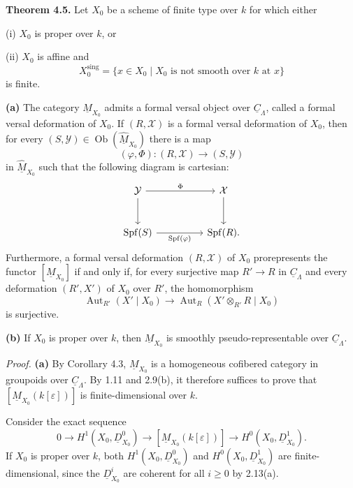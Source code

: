 
\medskip
\noindent\textbf{Theorem 4.5.}
Let $X_0$ be a scheme of finite type over $k$ for which either

\smallskip
\noindent(i) $X_0$ is proper over $k$, or

\noindent(ii) $X_0$ is affine and
\[
X_0^{\mathrm{sing}}
=\{x\in X_0\mid X_0\text{ is not smooth over }k\text{ at }x\}
\]
is finite.

\smallskip
\noindent\textbf{(a)}
The category $\underline M_{X_0}$ admits a formal versal object over
$\underline C_\Lambda$, called a formal versal deformation of $X_0$.
If $(R,\mathcal X)$ is a formal versal deformation of $X_0$, then for
every $(S,\mathcal Y)\in\operatorname{Ob}(\widehat{\underline M}_{X_0})$
there is a map
\[
(\varphi,\Phi):(R,\mathcal X)\longrightarrow(S,\mathcal Y)
\]
in $\widehat{\underline M}_{X_0}$ such that the following diagram is
cartesian:
\[
\begin{tikzcd}[column sep=huge,row sep=large]
\mathcal Y \arrow[r,"\Phi"] \arrow[d]
& \mathcal X \arrow[d] \\
\operatorname{Spf}(S)
 \arrow[r,"\operatorname{Spf}(\varphi)"']
& \operatorname{Spf}(R).
\end{tikzcd}
\]
Furthermore, a formal versal deformation $(R,\mathcal X)$ of $X_0$
prorepresents the functor $[\underline M_{X_0}]$ if and only if, for
every surjective map $R'\longrightarrow R$ in $\underline C_\Lambda$
and every deformation $(R',X')$ of $X_0$ over $R'$, the homomorphism
\[
\operatorname{Aut}_{R'}(X'\mid X_0)
\longrightarrow
\operatorname{Aut}_R(X'\otimes_{R'}R\mid X_0)
\]
is surjective.

\smallskip
\noindent\textbf{(b)}
If $X_0$ is proper over $k$, then $\underline M_{X_0}$ is smoothly
pseudo-representable over $\underline C_\Lambda$.


\medskip
\noindent\textit{Proof.}
\textbf{(a)} By Corollary 4.3, $\underline M_{X_0}$ is a homogeneous
cofibered category in groupoids over $\underline C_\Lambda$. By 1.11
and 2.9(b), it therefore suffices to prove that
$[\underline M_{X_0}(k[\varepsilon])]$ is finite-dimensional over
$k$.

Consider the exact sequence
\begin{equation}\tag{*}
0\longrightarrow H^1(X_0,\underline D^0_{X_0})
\longrightarrow[\underline M_{X_0}(k[\varepsilon])]
\longrightarrow H^0(X_0,\underline D^1_{X_0}).
\end{equation}
If $X_0$ is proper over $k$, both
$H^1(X_0,\underline D^0_{X_0})$ and
$H^0(X_0,\underline D^1_{X_0})$ are finite-dimensional, since the
$\underline D^i_{X_0}$ are coherent for all $i\geq0$ by 2.13(a).


